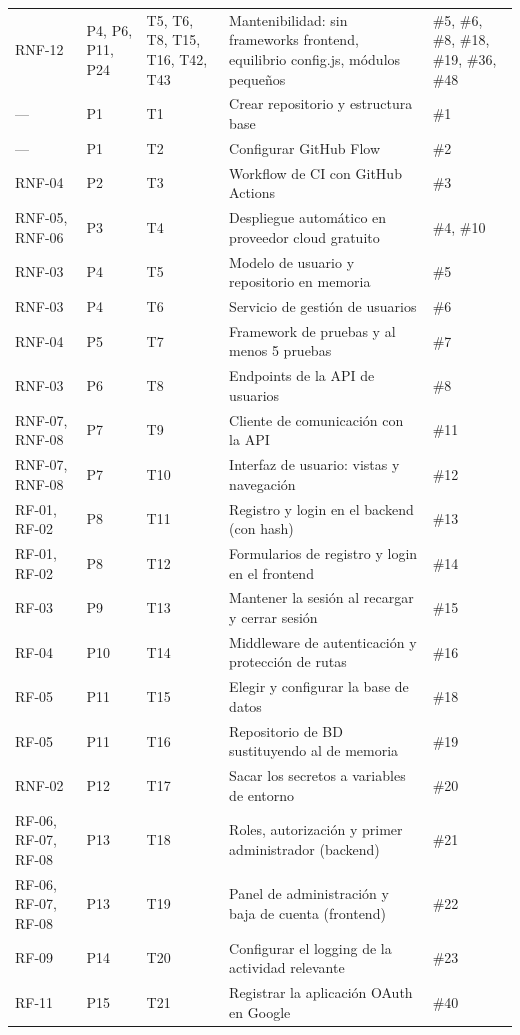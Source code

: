 {\begin{longtable}{@{}L{1.4cm} L{0.7cm} L{1.2cm} L{6.8cm} L{3.2cm}@{}}
RNF-12 & P4, P6, P11, P24 & T5, T6, T8, T15, T16, T42, T43 & Mantenibilidad: sin frameworks frontend, equilibrio config.js, módulos pequeños & \#5, \#6, \#8, \#18, \#19, \#36, \#48 \\
— & P1 & T1 & Crear repositorio y estructura base & \#1 \\
— & P1 & T2 & Configurar GitHub Flow & \#2 \\
RNF-04 & P2 & T3 & Workflow de CI con GitHub Actions & \#3 \\
RNF-05, RNF-06 & P3 & T4 & Despliegue automático en proveedor cloud gratuito & \#4, \#10 \\
RNF-03 & P4 & T5 & Modelo de usuario y repositorio en memoria & \#5 \\
RNF-03 & P4 & T6 & Servicio de gestión de usuarios & \#6 \\
RNF-04 & P5 & T7 & Framework de pruebas y al menos 5 pruebas & \#7 \\
RNF-03 & P6 & T8 & Endpoints de la API de usuarios & \#8 \\
RNF-07, RNF-08 & P7 & T9 & Cliente de comunicación con la API & \#11 \\
RNF-07, RNF-08 & P7 & T10 & Interfaz de usuario: vistas y navegación & \#12 \\
RF-01, RF-02 & P8 & T11 & Registro y login en el backend (con hash) & \#13 \\
RF-01, RF-02 & P8 & T12 & Formularios de registro y login en el frontend & \#14 \\
RF-03 & P9 & T13 & Mantener la sesión al recargar y cerrar sesión & \#15 \\
RF-04 & P10 & T14 & Middleware de autenticación y protección de rutas & \#16 \\
RF-05 & P11 & T15 & Elegir y configurar la base de datos & \#18 \\
RF-05 & P11 & T16 & Repositorio de BD sustituyendo al de memoria & \#19 \\
RNF-02 & P12 & T17 & Sacar los secretos a variables de entorno & \#20 \\
RF-06, RF-07, RF-08 & P13 & T18 & Roles, autorización y primer administrador (backend) & \#21 \\
RF-06, RF-07, RF-08 & P13 & T19 & Panel de administración y baja de cuenta (frontend) & \#22 \\
RF-09 & P14 & T20 & Configurar el logging de la actividad relevante & \#23 \\
RF-11 & P15 & T21 & Registrar la aplicación OAuth en Google & \#40 \\

\end{longtable}}
